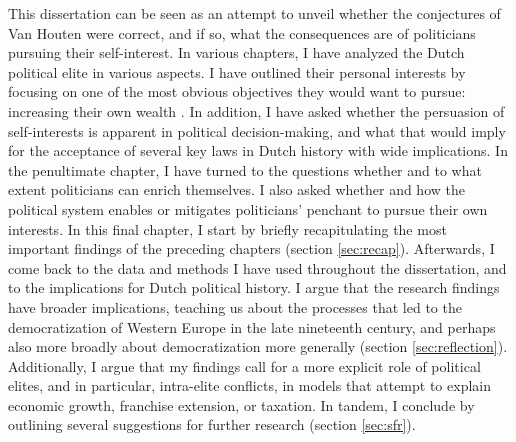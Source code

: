 This dissertation can be seen as an attempt to unveil whether the conjectures of Van Houten were correct, and if so, what the consequences are of politicians pursuing their self-interest. In various chapters, I have analyzed the Dutch political elite in various aspects. I have outlined their personal interests by focusing on one of the most obvious objectives they would want to pursue: increasing their own wealth \citep{buchanan1989essays}. In addition, I have asked whether the persuasion of self-interests is apparent in political decision-making, and what that would imply for the acceptance of several key laws in Dutch history with wide implications. In the penultimate chapter, I have turned to the questions whether and to what extent politicians can enrich themselves. I also asked whether and how the political system enables or mitigates politicians' penchant to pursue their own interests. In this final chapter, I start by briefly recapitulating the most important findings of the preceding chapters (section \ref{sec:recap}). Afterwards, I come back to the data and methods I have used throughout the dissertation, and to the implications for Dutch political history. I argue that the research findings have broader implications, teaching us about the processes that led to the democratization of Western Europe in the late nineteenth century, and perhaps also more broadly about democratization more generally (section \ref{sec:reflection}). Additionally, I argue that my findings call for a more explicit role of political elites, and in particular, intra-elite conflicts, in models that attempt to explain economic growth, franchise extension, or taxation. In tandem, I conclude by outlining several suggestions for further research (section \ref{sec:sfr}). 




